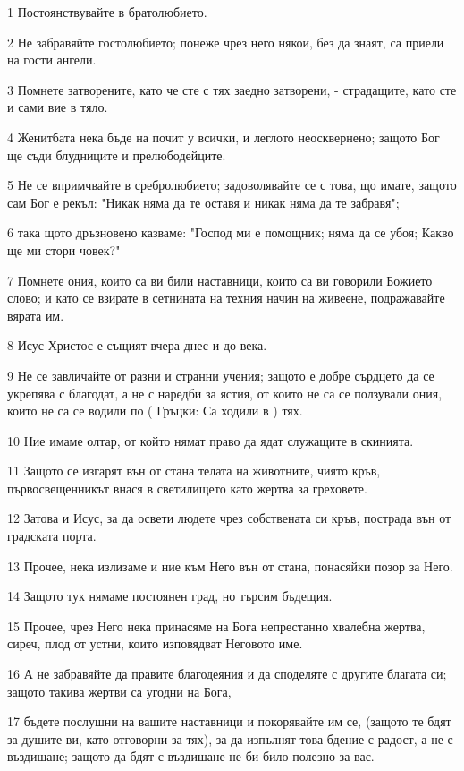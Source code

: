 \par 1 Постоянствувайте в братолюбието.
\par 2 Не забравяйте гостолюбието; понеже чрез него някои, без да знаят, са приели на гости ангели.
\par 3 Помнете затворените, като че сте с тях заедно затворени, - страдащите, като сте и сами вие в тяло.
\par 4 Женитбата нека бъде на почит у всички, и леглото неосквернено; защото Бог ще съди блудниците и прелюбодейците.
\par 5 Не се впримчвайте в сребролюбието; задоволявайте се с това, що имате, защото сам Бог е рекъл: "Никак няма да те оставя и никак няма да те забравя";
\par 6 така щото дръзновено казваме: "Господ ми е помощник; няма да се убоя; Какво ще ми стори човек?"
\par 7 Помнете ония, които са ви били наставници, които са ви говорили Божието слово; и като се взирате в сетнината на техния начин на живеене, подражавайте вярата им.
\par 8 Исус Христос е същият вчера днес и до века.
\par 9 Не се завличайте от разни и странни учения; защото е добре сърдцето да се укрепява с благодат, а не с наредби за ястия, от които не са се ползували ония, които не са се водили по ( Гръцки: Са ходили в ) тях.
\par 10 Ние имаме олтар, от който нямат право да ядат служащите в скинията.
\par 11 Защото се изгарят вън от стана телата на животните, чиято кръв, първосвещенникът внася в светилището като жертва за греховете.
\par 12 Затова и Исус, за да освети людете чрез собствената си кръв, пострада вън от градската порта.
\par 13 Прочее, нека излизаме и ние към Него вън от стана, понасяйки позор за Него.
\par 14 Защото тук нямаме постоянен град, но търсим бъдещия.
\par 15 Прочее, чрез Него нека принасяме на Бога непрестанно хвалебна жертва, сиреч, плод от устни, които изповядват Неговото име.
\par 16 А не забравяйте да правите благодеяния и да споделяте с другите благата си; защото такива жертви са угодни на Бога,
\par 17 бъдете послушни на вашите наставници и покорявайте им се, (защото те бдят за душите ви, като отговорни за тях), за да изпълнят това бдение с радост, а не с въздишане; защото да бдят с въздишане не би било полезно за вас.
